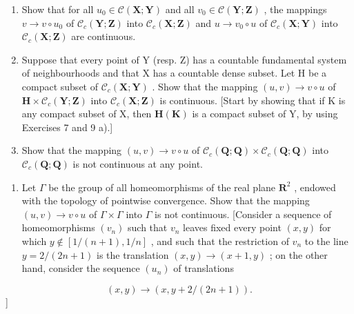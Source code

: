 \begin{enumerate}
\def\labelenumi{\alph{enumi})}
\item
  Show that for all \(u_0 \in \mathcal{C}(\mathbf{X}; \mathbf{Y})\) and all \(v_0 \in \mathcal{C}(\mathbf{Y}; \mathbf{Z})\) , the mappings \(v \to v \circ u_0\) of \(\mathcal{C}_c(\mathbf{Y}; \mathbf{Z})\) into \(\mathcal{C}_c(\mathbf{X}; \mathbf{Z})\) and \(u \to v_0 \circ u\) of \(\mathcal{C}_c(\mathbf{X}; \mathbf{Y})\) into \(\mathcal{C}_c(\mathbf{X}; \mathbf{Z})\) are continuous.
\item
  Suppose that every point of Y (resp. Z) has a countable fundamental system of neighbourhoods and that X has a countable dense subset. Let H be a compact subset of \(\mathcal{C}_{c}(\mathbf{X};\mathbf{Y})\) . Show that the mapping \((u,v)\to v\circ u\) of \(\mathbf{H}\times\mathcal{C}_{c}(\mathbf{Y};\mathbf{Z})\) into \(\mathcal{C}_{c}(\mathbf{X};\mathbf{Z})\) is continuous. {[}Start by showing that if K is any compact subset of X, then \(\mathbf{H}(\mathbf{K})\) is a compact subset of Y, by using Exercises 7 and 9 a).{]}
\item
  Show that the mapping \((u, v) \to v \circ u\) of \(\mathcal{C}_c(\mathbf{Q}; \mathbf{Q}) \times \mathcal{C}_c(\mathbf{Q}; \mathbf{Q})\) into \(\mathcal{C}_c(\mathbf{Q}; \mathbf{Q})\) is not continuous at any point.
\end{enumerate}

\begin{enumerate}
\def\labelenumi{\arabic{enumi})}
\setcounter{enumi}{13}
\tightlist
\item
  Let \(\Gamma\) be the group of all homeomorphisms of the real plane \(\mathbf{R}^2\) , endowed with the topology of pointwise convergence. Show that the mapping \((u, v) \to v \circ u\) of \(\Gamma \times \Gamma\) into \(\Gamma\) is not continuous. {[}Consider a sequence of homeomorphisms \((v_n)\) such that \(v_n\) leaves fixed every point \((x, y)\) for which \(y \notin [1/(n + 1), 1/n]\) , and such that the restriction of \(v_{n}\) to the line \(y = 2/(2n + 1)\) is the translation \((x, y) \to (x + 1, y)\) ; on the other hand, consider the sequence \((u_{n})\) of translations
\end{enumerate}

\[
(x, y) \rightarrow (x, y + 2 / (2 n + 1)).
\]
{]}


